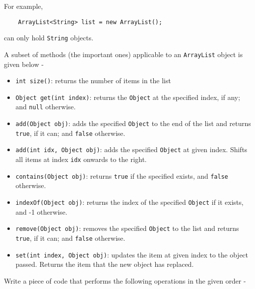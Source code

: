 \begin{questions}
\newpage

For example,

\begin{lstlisting}
    ArrayList<String> list = new ArrayList();
\end{lstlisting}

can only hold \texttt{String} objects.

A subset of methods (the important ones) applicable to an \texttt{ArrayList} object is given below -

\begin{itemize}
\item \texttt{int size()}: returns the number of items in the list
\item \texttt{Object get(int index)}: returns the \texttt{Object} at the specified index, if any; and \texttt{null} otherwise.
\item \texttt{add(Object obj)}: adds the specified \texttt{Object} to the end of the list and returns \texttt{true}, if it can; and \texttt{false} otherwise.
\item \texttt{add(int idx, Object obj)}: adds the specified \texttt{Object} at given index. Shifts all items at index \texttt{idx} onwards to the right.
\item \texttt{contains(Object obj)}: returns \texttt{true} if the specified exists, and \texttt{false} otherwise.
\item \texttt{indexOf(Object obj)}: returns the index of the specified \texttt{Object} if it exists, and -1 otherwise.
\item \texttt{remove(Object obj)}: removes the specified \texttt{Object} to the list and returns \texttt{true}, if it can; and \texttt{false} otherwise.
\item \texttt{set(int index, Object obj)}: updates the item at given index to the object passed. Returns the item that the new object has replaced.
\end{itemize}

Write a piece of code that performs the following operations in the given order -


\end{questions}
